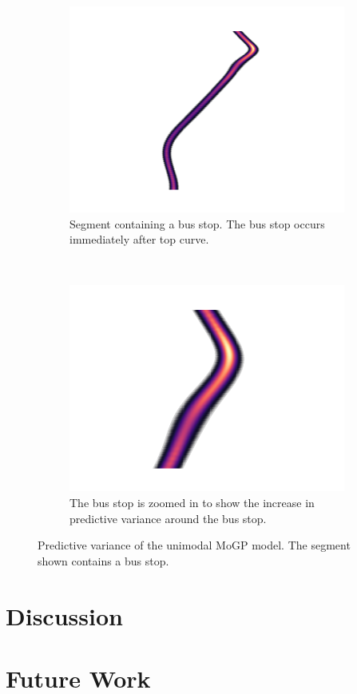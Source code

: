 \begin{figure}[h!]
    \centering
    \begin{subfigure}[t]{0.9\textwidth}
        \centering
        \includegraphics[width=\textwidth]{figures/2_1000x1000}
        \caption[]
        {\small Segment containing a bus stop.
        The bus stop occurs immediately after top curve.}
    \end{subfigure}
    ~
    \begin{subfigure}[t]{0.9\textwidth}
        \centering
        \includegraphics[width=\textwidth]{figures/3_1000x1000}
        \caption[]
        {\small The bus stop is zoomed in to show the increase in predictive variance around the bus stop.}
    \end{subfigure}
    \caption[Predictive variance of the unimodal MoGP model]
    {\small Predictive variance of the unimodal MoGP model.
    The segment shown contains a bus stop.}
    \label{fig:predictive-var-combined-gp2}
\end{figure}

\section{Discussion}

\section{Future Work}